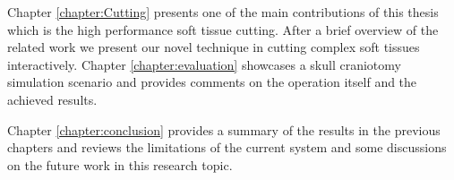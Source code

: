Chapter \ref{chapter:Cutting} presents one of the main contributions of this thesis which is the high performance soft tissue cutting. After a brief overview of the 
related work we present our novel technique in cutting complex soft tissues interactively. Chapter \ref{chapter:evaluation} showcases a skull craniotomy simulation 
scenario and provides comments on the operation itself and the achieved results.

Chapter \ref{chapter:conclusion} provides a summary of the results in the previous chapters and reviews the limitations of the current system
and some discussions on the future work in this research topic.

















